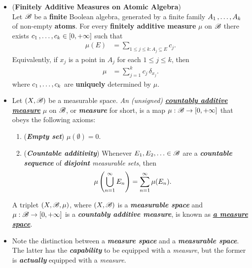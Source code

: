 \documentclass[11pt]{article}
\begin{document}
\begin{itemize}
\item \begin{proposition} (\textbf{Finitely Additive Measures on Atomic Algebra})\\
Let ${\mathscr B}$ be a \textbf{finite} Boolean algebra, generated by a finite family $A_1 \,{,}\ldots{,}\, A_k$ of non-empty \textbf{atoms}. For every \textbf{finitely additive measure} $\mu$ on ${\mathscr B}$ there exists $c_1 \,{,}\ldots{,}\, c_k \in [0, +\infty]$ such that
\begin{align*}
\mu(E) &= \sum_{1 \le j \le k: A_j \subseteq E} c_j.
\end{align*}
Equivalently, if $x_j$ is a point in $A_j$ for each $1 \le j \le k$, then
\begin{align*}
\mu &= \sum_{j=1}^{k}c_j\,\delta_{x_j}. 
\end{align*}
where $c_1 \,{,}\ldots{,}\, c_k$ are \textbf{uniquely} determined by $\mu$.
\end{proposition}

\item \begin{definition} 
Let $(X, {\mathscr B})$ be a measurable space. \emph{An (unsigned) \underline{\textbf{countably additive measure}}} $\mu$ on ${\mathscr B}$, or \emph{\textbf{measure}} for short, is a map $\mu: {\mathscr B} \rightarrow [0, +\infty]$ that obeys the following axioms:
\begin{enumerate}
\item (\emph{\textbf{Empty set}}) $\mu(\emptyset) = 0$.
\item (\emph{\textbf{Countable additivity}}) Whenever $E_1, E_2, \ldots \in {\mathscr B}$ are a \emph{\textbf{countable sequence}} of \emph{\textbf{disjoint} measurable sets}, then 
\begin{align*}
\mu\left(\bigcup_{n=1}^{\infty} E_n\right) &= \sum_{n=1}^{\infty} \mu(E_n).
\end{align*}
\end{enumerate}
A triplet $(X, {\mathscr B}, \mu)$, where $(X, {\mathscr B})$ is a \emph{\textbf{measurable space}} and $\mu: {\mathscr B} \rightarrow [0, +\infty]$ is a \emph{\textbf{countably additive measure}}, is known as \underline{\emph{\textbf{a measure space}}}.
\end{definition}

\item \begin{remark}
Note the distinction between a \emph{\textbf{measure space}} and a \emph{\textbf{measurable space}}. The latter has the \emph{\textbf{capability}} to be equipped with a \emph{measure}, but the former is \emph{\textbf{actually}} equipped with a \emph{measure}.
\end{remark}


\end{itemize}
\end{document}
